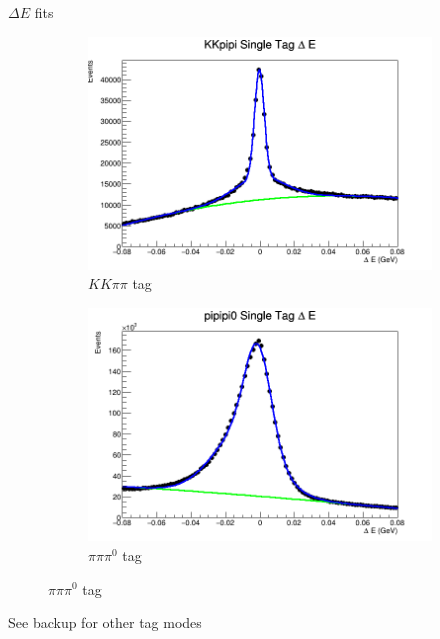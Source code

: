 \documentclass{beamer}
\begin{document}
\begin{frame}{$\Delta E$ fits}
  \begin{figure}
    \centering
    \vspace{-0.2cm}
    \begin{subfigure}{0.5\textwidth}
      \includegraphics[width = 1\textwidth]{KKpipiDeltaE.png}
      \caption{$KK\pi\pi$ tag}
    \end{subfigure}%
    \begin{subfigure}{0.5\textwidth}
      \includegraphics[width = 1\textwidth]{pipipi0DeltaE.png}
      \caption{$\pi\pi\pi^0$ tag}
    \end{subfigure}
  \end{figure}
  See backup for other tag modes
\end{frame}
\end{document}
